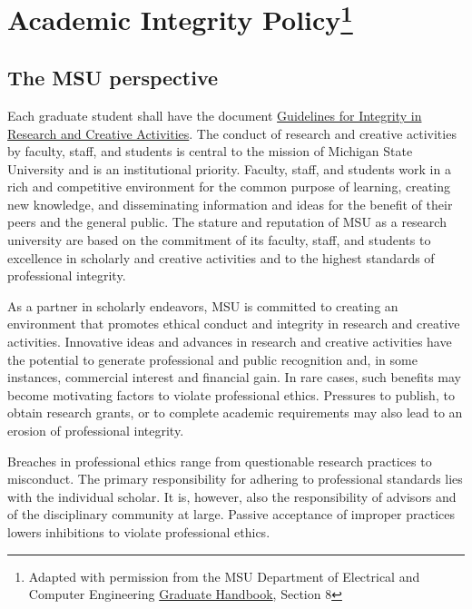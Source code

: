 \section[Academic Integrity Policy]{Academic Integrity
  Policy\footnote{Adapted with permission from the MSU
    Department of Electrical and Computer Engineering
    \href{https://ece.msu.edu/sites/default/files/content/Graduate-Student-Handbook\%20-\%203-26-12\%20_0.pdf}{Graduate
      Handbook}, Section 8}}

\subsection{The MSU perspective}

Each graduate student shall have the document
\href{https://grad.msu.edu/sites/default/files/content/researchintegrity/guidelines.pdf}{Guidelines
  for Integrity in Research and Creative Activities}.   The conduct of research and creative activities by
faculty, staff, and students is central to the mission of Michigan
State University and is an institutional priority. Faculty, staff, and
students work in a rich and competitive environment for the common
purpose of learning, creating new knowledge, and disseminating
information and ideas for the benefit of their peers and the general
public. The stature and reputation of MSU as a research university are
based on the commitment of its faculty, staff, and students to
excellence in scholarly and creative activities and to the highest
standards of professional integrity.  

As a partner in scholarly endeavors, MSU is committed to creating an
environment that promotes ethical conduct and integrity in research
and creative activities. Innovative ideas and advances in research and
creative activities have the potential to generate professional and
public recognition and, in some instances, commercial interest and
financial gain. In rare cases, such benefits may become motivating
factors to violate professional ethics. Pressures to publish, to
obtain research grants, or to complete academic requirements may also
lead to an erosion of professional integrity.  

Breaches in professional ethics range from questionable research
practices to misconduct. The primary responsibility for adhering to
professional standards lies with the individual scholar. It is,
however, also the responsibility of advisors and of the disciplinary
community at large. Passive acceptance of improper practices lowers
inhibitions to violate professional ethics. 

